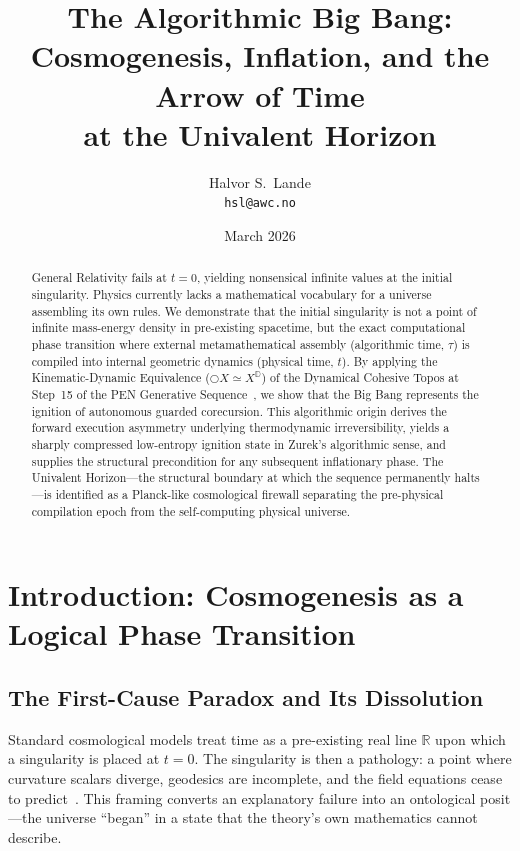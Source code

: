 \documentclass[11pt,a4paper]{article}
\title{\textbf{The Algorithmic Big Bang:\\
Cosmogenesis, Inflation, and the Arrow of Time\\
at the Univalent Horizon}}
\author{Halvor S.\ Lande\\
\texttt{hsl@awc.no}}
\date{March 2026}
\theoremstyle{plain}
\theoremstyle{definition}
\theoremstyle{remark}
\newcommand{\R}{\mathbb{R}}
\newcommand{\D}{\mathbb{D}}
\newcommand{\nextmod}{\bigcirc}
\begin{document}
\maketitle

\begin{abstract}
General Relativity fails at $t = 0$, yielding nonsensical infinite values at the initial singularity.
Physics currently lacks a mathematical vocabulary for a universe assembling its own rules.
We demonstrate that the initial singularity is not a point of infinite mass-energy density in pre-existing spacetime, but the exact computational phase transition where external metamathematical assembly (algorithmic time, $\tau$) is compiled into internal geometric dynamics (physical time, $t$).
By applying the Kinematic-Dynamic Equivalence ($\nextmod X \simeq X^{\D}$) of the Dynamical Cohesive Topos at Step~15 of the PEN Generative Sequence~\cite{pen}, we show that the Big Bang represents the ignition of autonomous guarded corecursion.
This algorithmic origin derives the forward execution asymmetry underlying thermodynamic irreversibility, yields a sharply compressed low-entropy ignition state in Zurek's algorithmic sense, and supplies the structural precondition for any subsequent inflationary phase.
The Univalent Horizon---the structural boundary at which the sequence permanently halts---is identified as a Planck-like cosmological firewall separating the pre-physical compilation epoch from the self-computing physical universe.
\end{abstract}

\section{Introduction: Cosmogenesis as a Logical Phase Transition}
\label{sec:introduction}

\subsection{The First-Cause Paradox and Its Dissolution}

Standard cosmological models treat time as a pre-existing real line $\R$ upon which a singularity is placed at $t = 0$.
The singularity is then a pathology: a point where curvature scalars diverge, geodesics are incomplete, and the field equations cease to predict~\cite{hawking-ellis}.
This framing converts an explanatory failure into an ontological posit---the universe ``began'' in a state that the theory's own mathematics cannot describe.
\end{document}
